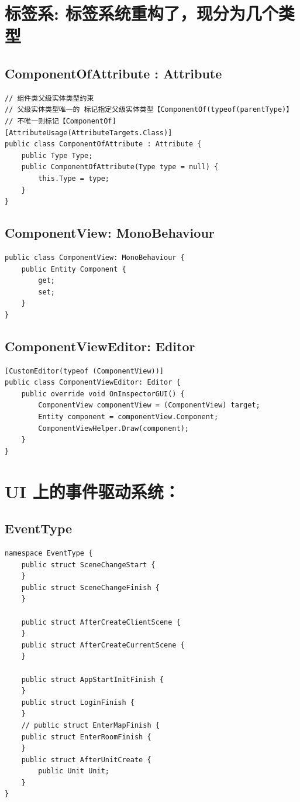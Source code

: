 \documentclass[9pt, b5paper]{article}
\begin{document}
\section{标签系: 标签系统重构了，现分为几个类型}
\label{sec-4}
\subsection{ComponentOfAttribute : Attribute}
\label{sec-4-1}
\begin{verbatim}
// 组件类父级实体类型约束
// 父级实体类型唯一的 标记指定父级实体类型【ComponentOf(typeof(parentType)】
// 不唯一则标记【ComponentOf]
[AttributeUsage(AttributeTargets.Class)]
public class ComponentOfAttribute : Attribute {
    public Type Type;
    public ComponentOfAttribute(Type type = null) {
        this.Type = type;
    }
}
\end{verbatim}
\subsection{ComponentView: MonoBehaviour}
\label{sec-4-2}
\begin{verbatim}
public class ComponentView: MonoBehaviour {
    public Entity Component {
        get;
        set;
    }
}
\end{verbatim}
\subsection{ComponentViewEditor: Editor}
\label{sec-4-3}
\begin{verbatim}
[CustomEditor(typeof (ComponentView))] 
public class ComponentViewEditor: Editor {
    public override void OnInspectorGUI() {
        ComponentView componentView = (ComponentView) target;
        Entity component = componentView.Component;
        ComponentViewHelper.Draw(component);
    }
}
\end{verbatim}


\section{UI 上的事件驱动系统：}
\label{sec-5}
\subsection{EventType}
\label{sec-5-1}
\begin{verbatim}
namespace EventType {
    public struct SceneChangeStart {
    }
    public struct SceneChangeFinish {
    }

    public struct AfterCreateClientScene {
    }
    public struct AfterCreateCurrentScene {
    }

    public struct AppStartInitFinish {
    }
    public struct LoginFinish {
    }
    // public struct EnterMapFinish {
    public struct EnterRoomFinish {
    }
    public struct AfterUnitCreate {
        public Unit Unit;
    }
}
\end{verbatim}
\end{document}
